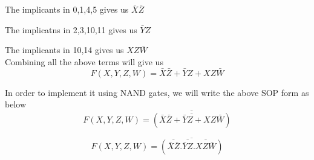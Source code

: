 \documentclass[12pt]{article}
\begin{document}
The implicants in 0,1,4,5 gives us $\bar{X}\bar{Z}$

The implicatns in 2,3,10,11 gives us $\bar{Y}Z$

The implicants in 10,14 gives us $XZ\bar{W}$ \\

Combining all the above terms will give us 
\begin{equation}
    F(X,Y,Z,W) = \bar{X}\bar{Z} + \bar{Y}Z + XZ\bar{W}
\end{equation}

In order to implement it using NAND gates, we will write the above SOP form as below
\begin{equation}
    F(X,Y,Z,W) = \overline{(\overline{\bar{X}\bar{Z} + \bar{Y}Z + XZ\bar{W}})}
\end{equation}

\begin{equation}
    F(X,Y,Z,W) = \overline{(\overline{\bar{X}\bar{Z}} . \overline{\bar{Y}Z} . \overline{XZ\bar{W}})}
\end{equation}
\newpage
\end{document}
